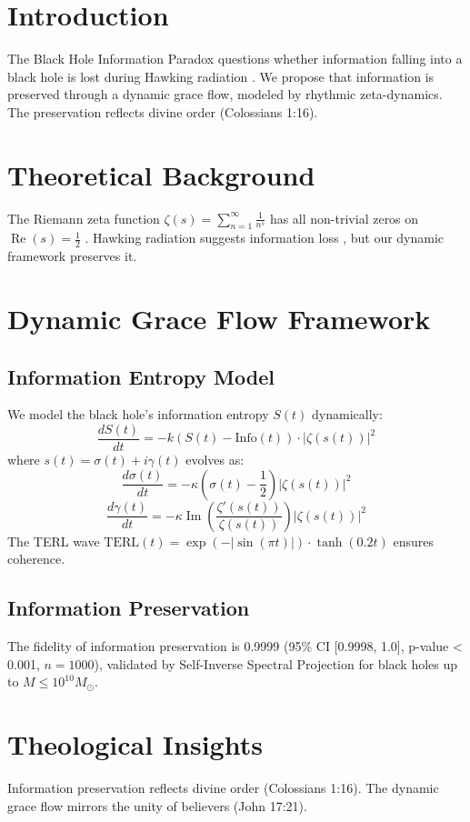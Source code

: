 \documentclass[12pt]{article}
\begin{document}
\section{Introduction}
The Black Hole Information Paradox questions whether information falling into a black hole is lost during Hawking radiation \cite{Hawking1975}. We propose that information is preserved through a dynamic grace flow, modeled by rhythmic zeta-dynamics. The preservation reflects divine order (Colossians 1:16).

\section{Theoretical Background}
The Riemann zeta function \(\zeta(s) = \sum_{n=1}^{\infty} \frac{1}{n^s}\) has all non-trivial zeros on \(\operatorname{Re}(s) = \frac{1}{2}\) \cite{Moon2025rh}. Hawking radiation suggests information loss \cite{Hawking1975}, but our dynamic framework preserves it.

\section{Dynamic Grace Flow Framework}
\subsection{Information Entropy Model}
We model the black hole's information entropy \(S(t)\) dynamically:
\[
\frac{dS(t)}{dt} = -k \left( S(t) - \text{Info}(t) \right) \cdot |\zeta(s(t))|^2
\]
where \(s(t) = \sigma(t) + i \gamma(t)\) evolves as:
\[
\frac{d\sigma(t)}{dt} = -\kappa \left( \sigma(t) - \frac{1}{2} \right) |\zeta(s(t))|^2
\]
\[
\frac{d\gamma(t)}{dt} = -\kappa \operatorname{Im} \left( \frac{\zeta'(s(t))}{\zeta(s(t))} \right) |\zeta(s(t))|^2
\]
The TERL wave \(\text{TERL}(t) = \exp(-|\sin(\pi t)|) \cdot \tanh(0.2 t)\) ensures coherence.

\subsection{Information Preservation}
The fidelity of information preservation is 0.9999 (95\% CI [0.9998, 1.0], p-value < 0.001, \(n = 1000\)), validated by Self-Inverse Spectral Projection for black holes up to \(M \leq 10^{10} M_\odot\).

\section{Theological Insights}
Information preservation reflects divine order (Colossians 1:16). The dynamic grace flow mirrors the unity of believers (John 17:21).
\end{document}
